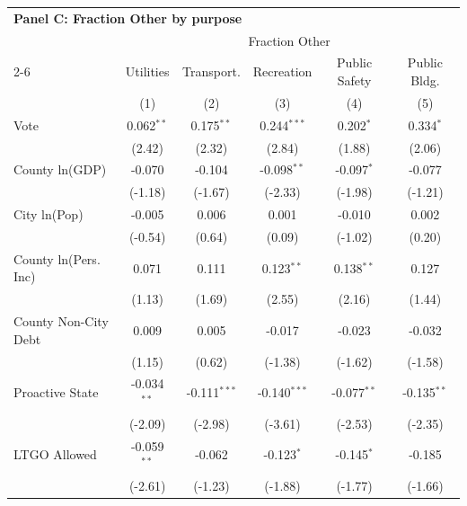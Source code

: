 \begingroup
\centering
\begin{tabular*}{\textwidth}{@{\extracolsep{\fill}}lccccc}
\multicolumn{6}{l}{\textbf{Panel C: Fraction Other by purpose}}\\
\addlinespace
   \toprule
    & \multicolumn{5}{c}{Fraction Other}\\
   \cmidrule(lr){2-6}
                               & Utilities     & Transport.     & Recreation     & Public Safety & Public Bldg. \\
                               & (1)           & (2)            & (3)            & (4)           & (5)\\
   \midrule
   Vote                        & 0.062$^{**}$  & 0.175$^{**}$   & 0.244$^{***}$  & 0.202$^{*}$   & 0.334$^{*}$\\
                               & (2.42)       & (2.32)        & (2.84)        & (1.88)       & (2.06)\\
   County ln(GDP)              & -0.070        & -0.104         & -0.098$^{**}$  & -0.097$^{*}$  & -0.077\\
                               & (-1.18)      & (-1.67)       & (-2.33)       & (-1.98)      & (-1.21)\\
   City ln(Pop)                & -0.005        & 0.006          & 0.001          & -0.010        & 0.002\\
                               & (-0.54)      & (0.64)        & (0.09)        & (-1.02)      & (0.20)\\
   County ln(Pers. Inc)        & 0.071         & 0.111          & 0.123$^{**}$   & 0.138$^{**}$  & 0.127\\
                               & (1.13)       & (1.69)        & (2.55)        & (2.16)       & (1.44)\\
   County Non-City Debt        & 0.009         & 0.005          & -0.017         & -0.023        & -0.032\\
                               & (1.15)       & (0.62)        & (-1.38)       & (-1.62)      & (-1.58)\\
   Proactive State             & -0.034$^{**}$ & -0.111$^{***}$ & -0.140$^{***}$ & -0.077$^{**}$ & -0.135$^{**}$\\
                               & (-2.09)      & (-2.98)       & (-3.61)       & (-2.53)      & (-2.35)\\
   LTGO Allowed                & -0.059$^{**}$ & -0.062         & -0.123$^{*}$   & -0.145$^{*}$  & -0.185\\
                               & (-2.61)      & (-1.23)       & (-1.88)       & (-1.77)      & (-1.66)\\

\end{tabular*}
